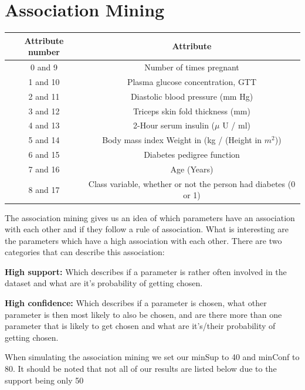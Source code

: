 \section{Association Mining}

\begin{center}
 \begin{tabular}{||c c||}
 \hline
 Attribute number & Attribute \\ [0.5ex]
 \hline\hline
 0 and 9 & Number of times pregnant \\
 \hline
 1 and 10 & Plasma glucose concentration, GTT \\
 \hline
 2 and 11 & Diastolic blood pressure (mm Hg) \\
 \hline
 3 and 12 & Triceps skin fold thickness (mm) \\
 \hline
 4 and 13 & 2-Hour serum insulin ($\mu$ U / ml) \\
 \hline
 5 and 14 & Body mass index Weight in (kg / (Height in $m^2$)) \\
 \hline
 6 and 15 & Diabetes pedigree function \\
 \hline
 7 and 16 & Age (Years) \\
 \hline
 8 and 17 & Class variable, whether or not the person had diabetes (0 or 1) \\ [1ex]
 \hline
\end{tabular}
\end{center}

The association mining gives us an idea of which parameters have an association with each other and if they follow a rule of association.
What is interesting are the parameters which have a high association with each other.
There are two categories that can describe this association:

\textbf{High support:} Which describes if a parameter is rather often involved in the dataset and what are it's probability of getting chosen.

\textbf{High confidence:} Which describes if a parameter is chosen, what other parameter is then most likely to also be chosen, and are there more than one parameter that is likely to get chosen and what are it's/their probability of getting chosen.

When simulating the association mining we set our minSup to 40 and minConf to 80.
It should be noted that not all of our results are listed below due to the support being only 50%

